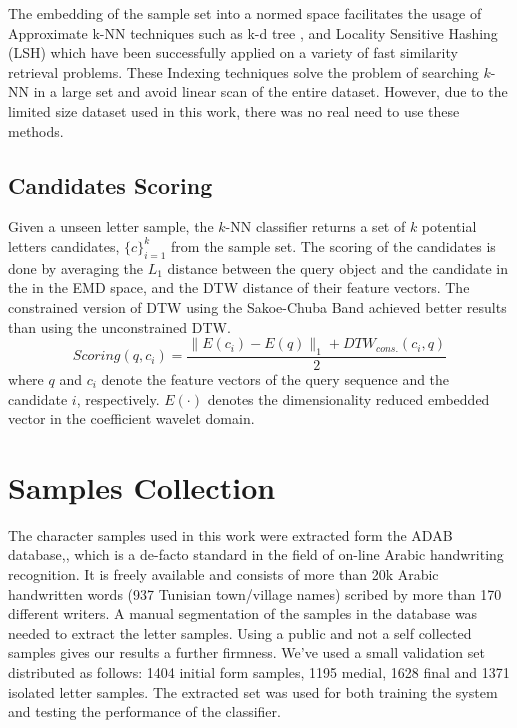 \documentclass[10pt, conference, compsocconf]{IEEEtran}
\begin{document}
The embedding of the sample set into a normed space facilitates the usage of Approximate k-NN techniques such as k-d tree \cite{bentley1975multidimensional}, and Locality Sensitive Hashing (LSH) \cite{gionis1999similarity} which have been successfully applied on a variety of fast similarity retrieval problems.
These Indexing techniques solve the problem of searching $k$-NN in a large set and avoid linear scan of the entire dataset.
However, due to the limited size dataset used in this work, there was no real need to use these methods.

\subsection{Candidates Scoring}
Given a unseen letter sample, the $k$-NN classifier returns a set of $k$ potential letters candidates, $\{c\}_{i=1}^{k}$ from the sample set.
The scoring of the candidates is done by averaging the $L_1$ distance between the query object and the candidate in the in the EMD space, and the DTW distance of their feature vectors.
The constrained version of DTW using the Sakoe-Chuba Band \cite{sakoe1978dynamic} achieved better results than using the unconstrained DTW.
\begin{equation}
Scoring(q,c_i)=\frac{\|E(c_i)-E(q)\|_1+DTW_{cons.}(c_i,q)}{2}
\end{equation}
where $q$ and $c_i$ denote the feature vectors of the query sequence and the candidate $i$, respectively. 
$E(\cdot)$ denotes the dimensionality reduced embedded vector in the coefficient wavelet domain. 

\section{Samples Collection}
\label{sec:samples_collection}
The character samples used in this work were extracted form the ADAB database,\cite{el2009icdar}, which is a de-facto standard in the field of on-line Arabic handwriting recognition. 
It is freely available and consists of more than 20k Arabic handwritten words (937 Tunisian town/village names) scribed by more than 170 different writers. 
A manual segmentation of the samples in the database was needed to extract the letter samples.
Using a public and not a self collected samples gives our results a further firmness.
We've used a small validation set distributed as follows: 1404 initial form samples, 1195 medial, 1628 final and 1371 isolated letter samples. 
The extracted  set was used for both training the system and testing the performance of the classifier.
\end{document}
